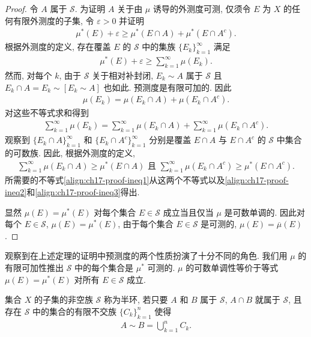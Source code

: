 \documentclass[../../main.tex]{subfiles}
\begin{document}
\begin{proof}
令 $A$ 属于 $\mathcal{S}$. 为证明 $A$ 关于由 $\mu$ 诱导的外测度可测, 仅须令 $E$ 为 $X$ 的任何有限外测度的子集, 令 $\varepsilon>0$ 并证明
\begin{align}
\mu^*(E)+\varepsilon\geqslant\mu^*(E\cap A)+\mu^*(E\cap A^{c}).\label{align:ch17-proof-ineq1}
\end{align}
根据外测度的定义, 存在覆盖 $E$ 的 $\mathcal{S}$ 中的集族 $\{E_{k}\}_{k=1}^{\infty}$ 满足
\begin{align}
\mu^*(E)+\varepsilon\geqslant\sum_{k=1}^{\infty}\mu(E_{k}).\label{align:ch17-proof-ineq2}
\end{align}
然而, 对每个 $k$, 由于 $\mathcal{S}$ 关于相对补封闭, $E_{k}\sim A$ 属于 $\mathcal{S}$ 且 $E_{k}\cap A=E_{k}\sim[E_{k}\sim A]$ 也如此. 预测度是有限可加的. 因此
\begin{align*}
\mu(E_{k})=\mu(E_{k}\cap A)+\mu(E_{k}\cap A^{c}).
\end{align*}
对这些不等式求和得到
\begin{align}
\sum_{k=1}^{\infty}\mu(E_{k})=\sum_{k=1}^{\infty}\mu(E_{k}\cap A)+\sum_{k=1}^{\infty}\mu(E_{k}\cap A^{c}).\label{align:ch17-proof-ineq3}
\end{align}
观察到 $\{E_{k}\cap A\}_{k=1}^{\infty}$ 和 $\{E_{k}\cap A^{c}\}_{k=1}^{\infty}$ 分别是覆盖 $E\cap A$ 与 $E\cap A^{c}$ 的 $\mathcal{S}$ 中集合的可数族. 因此, 根据外测度的定义,
\begin{align*}
\sum_{k=1}^{\infty}\mu(E_{k}\cap A)\geqslant\mu^*(E\cap A)\text{ 且 }\sum_{k=1}^{\infty}\mu(E_{k}\cap A^{c})\geqslant\mu^*(E\cap A^{c}).
\end{align*}
所需要的不等式\eqref{align:ch17-proof-ineq1}从这两个不等式以及\eqref{align:ch17-proof-ineq2}和\eqref{align:ch17-proof-ineq3}得出.

显然 $\mu(E)=\mu^*(E)$ 对每个集合 $E\in\mathcal{S}$ 成立当且仅当 $\mu$ 是可数单调的. 因此对每个 $E\in\mathcal{S}$, $\mu(E)=\mu^*(E)$, 由于每个集合 $E\in\mathcal{S}$ 是可测的, $\mu(E)=\overline{\mu}(E)$.
\end{proof}

\begin{remark}
观察到在上述定理的证明中预测度的两个性质扮演了十分不同的角色. 我们用 $\mu$ 的有限可加性推出 $\mathcal{S}$ 中的每个集合是 $\mu^*$ 可测的. $\mu$ 的可数单调性等价于等式 $\mu(E)=\mu^*(E)$ 对所有 $E\in\mathcal{S}$ 成立.
\end{remark}

\begin{definition}[半环]\label{definition:ch17-semiring}
集合 $X$ 的子集的非空族 $\mathcal{S}$ 称为半环, 若只要 $A$ 和 $B$ 属于 $\mathcal{S}$, $A\cap B$ 就属于 $\mathcal{S}$, 且存在 $\mathcal{S}$ 中的集合的有限不交族 $\{C_{k}\}_{k=1}^{n}$ 使得
\begin{align*}
A\sim B=\bigcup_{k=1}^{n}C_{k}.
\end{align*}
\end{definition}
\end{document}
